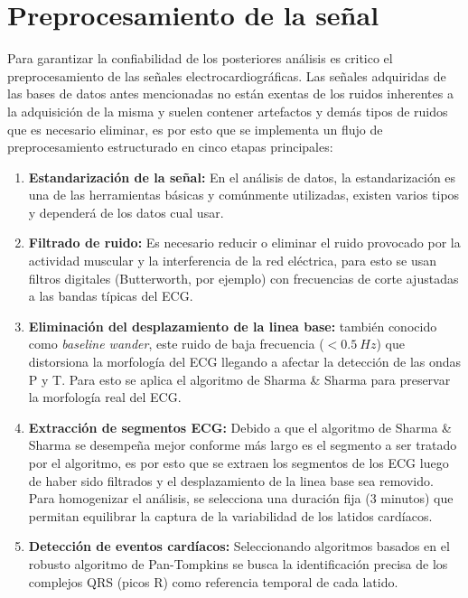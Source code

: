 \documentclass[12pt,letterpaper,oneside,openright]{book}
\begin{document}
\section{Preprocesamiento de la señal}
	
Para garantizar la confiabilidad de los posteriores análisis es critico el preprocesamiento de las señales electrocardiográficas. Las señales adquiridas de las bases de datos antes mencionadas no están exentas de los ruidos inherentes a la adquisición de la misma y suelen contener artefactos y demás tipos de ruidos que es necesario eliminar, es por esto que se implementa un flujo de preprocesamiento estructurado en cinco etapas principales:
\begin{enumerate}
	\item \textbf{Estandarización de la señal:} En el análisis de datos, la estandarización es una de las herramientas básicas y comúnmente utilizadas, existen varios tipos y dependerá de los datos cual usar.
	\item \textbf{Filtrado de ruido:} Es necesario reducir o eliminar el ruido provocado por la actividad muscular y la interferencia de la red eléctrica, para esto se usan filtros digitales (Butterworth, por ejemplo) con frecuencias de corte ajustadas a las bandas típicas del ECG.
	\item \textbf{Eliminación del desplazamiento de la linea base:} también conocido como \emph{baseline wander}, este ruido de baja frecuencia ($<0.5\ Hz$) que distorsiona la morfología del ECG llegando a afectar la detección de las ondas P y T. Para esto se aplica el algoritmo de Sharma \& Sharma \cite{Sharma15} para preservar la morfología real del ECG.
	\item \textbf{Extracción de segmentos ECG:} Debido a que el algoritmo de Sharma \& Sharma \cite{Sharma15} se desempeña mejor conforme más largo es el segmento a ser tratado por el algoritmo, es por esto que se extraen los segmentos de los ECG luego de haber sido filtrados y el desplazamiento de la linea base sea removido. Para homogenizar el análisis, se selecciona una duración fija (3 minutos) que permitan equilibrar la captura de la variabilidad de los latidos cardíacos. 
	\item \textbf{Detección de eventos cardíacos:} Seleccionando algoritmos basados en el robusto algoritmo de Pan-Tompkins \cite{PanTompkins85} se busca la identificación precisa de los complejos QRS (picos R) como referencia temporal de cada latido.
\end{enumerate}
\end{document}
